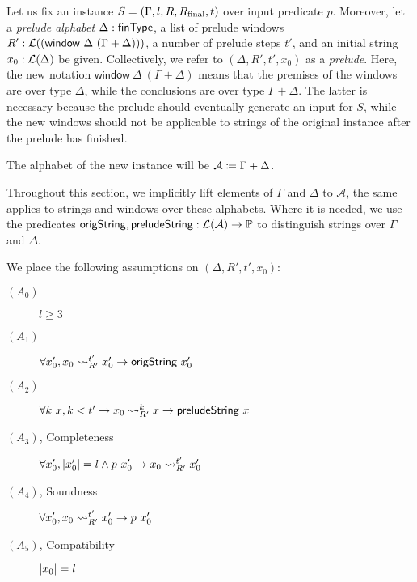 Let us fix an \expr{} instance $S = (\Gamma, l, R, R_{\text{final}}, t)$ over input predicate $p$. 
Moreover, let a \emph{prelude alphabet} $\Delta : \textsf{finType}$, a list of prelude windows $R' : \mathcal{L} ((\textsf{window}~\Delta~(\Gamma + \Delta)))$, a number of prelude steps $t'$, and an initial string $x_0 : \mathcal{L} (\Delta)$ be given. Collectively, we refer to $(\Delta, R', t', x_0)$ as a \emph{prelude}. 
Here, the new notation $\textsf{window}~\Delta~(\Gamma + \Delta)$ means that the premises of the windows are over type $\Delta$, while the conclusions are over type $\Gamma + \Delta$. The latter is necessary because the prelude should eventually generate an input for $S$, while the new windows should not be applicable to strings of the original instance after the prelude has finished.

The alphabet of the new \PR{} instance will be $\mathcal{A} \coloneqq \Gamma + \Delta$.

\newcommand{\isOrigString}{\textsf{origString}}
\newcommand{\isPreludeString}{\textsf{preludeString}}

\mnote[isOrigString]{\isOrigString}
Throughout this section, we implicitly lift elements of $\Gamma$ and $\Delta$ to $\mathcal{A}$, the same applies to strings and windows over these alphabets. 
Where it is needed, we use the predicates $\isOrigString, \isPreludeString : \listsof{\mathcal{A}} \rightarrow \Prop$ to distinguish strings over $\Gamma$ and $\Delta$. 
\mnote[isPreludeString]{\isPreludeString}

\begin{assumption}
  We place the following assumptions on $(\Delta, R', t', x_0)$: 
  \begin{description}
    \item[$(A_0)$] $l \ge 3$
    \item[$(A_1)$] $\forall x_0', x_0 \strent{R'}^{t'} x_0' \rightarrow \isOrigString~x_0'$
    \item[$(A_2)$] $\forall k~x, k < t' \rightarrow x_0 \strent{R'}^k x \rightarrow \isPreludeString~x$
    \item[$(A_3)$, Completeness] $\forall x_0', |x_0'| = l \land p~x_0' \rightarrow x_0 \rightsquigarrow_{R'}^{t'} x_0'$
    \item[$(A_4)$, Soundness] $\forall x_0', x_0 \rightsquigarrow_{R'}^{t'} x_0' \rightarrow p~x_0'$ 
    \item[$(A_5)$, Compatibility] $|x_0| = l$
  \end{description}
\end{assumption}

